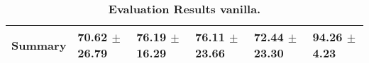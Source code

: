 \begin{table}[htb]
{\begin{tabular}{llllll}
\midrule
\textbf{Summary                                  } &                  \phantom{0}70.62 $\pm$ 26.79 &                      \phantom{0}76.19 $\pm$ 16.29 &                  \phantom{0}76.11 $\pm$ 23.66 &                  \phantom{0}72.44 $\pm$ 23.30 &  \phantom{0}94.26 $\pm$ \phantom{0}4.23 \\
\bottomrule
\end{tabular}%
}
\caption{\textbf{Evaluation Results vanilla.}}
\label{tab:eval-results}
\end{table}


